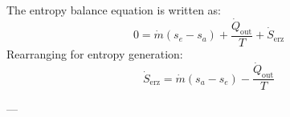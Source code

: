 The entropy balance equation is written as:  
\[
0 = \dot{m}(s_e - s_a) + \frac{\dot{Q}_{\text{out}}}{T} + \dot{S}_{\text{erz}}
\]  
Rearranging for entropy generation:  
\[
\dot{S}_{\text{erz}} = \dot{m}(s_a - s_e) - \frac{\dot{Q}_{\text{out}}}{T}
\]  

---